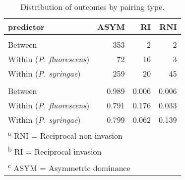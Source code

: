 \begin{table}[!ht]

\caption{\label{tab:S2}Distribution of outcomes by pairing type.}
\centering
\begin{tabular}[t]{lrrr}
\toprule
predictor & ASYM & RI & RNI\\
\midrule
\addlinespace[0.3em]
\multicolumn{4}{l}{\textbf{Counts}}\\
\hspace{1em}Between & 353 & 2 & 2\\
\hspace{1em}Within (\textit{P. fluorescens}) & 72 & 16 & 3\\
\hspace{1em}Within (\textit{P. syringae}) & 259 & 20 & 45\\
\addlinespace[0.3em]
\multicolumn{4}{l}{\textbf{Frequencies}}\\
\hspace{1em}Between & 0.989 & 0.006 & 0.006\\
\hspace{1em}Within (\textit{P. fluorescens}) & 0.791 & 0.176 & 0.033\\
\hspace{1em}Within (\textit{P. syringae}) & 0.799 & 0.062 & 0.139\\
\bottomrule
\multicolumn{4}{l}{\textsuperscript{a} RNI = Reciprocal non-invasion}\\
\multicolumn{4}{l}{\textsuperscript{b} RI = Reciprocal invasion}\\
\multicolumn{4}{l}{\textsuperscript{c} ASYM = Asymmetric dominance}\\
\end{tabular}
\end{table}
